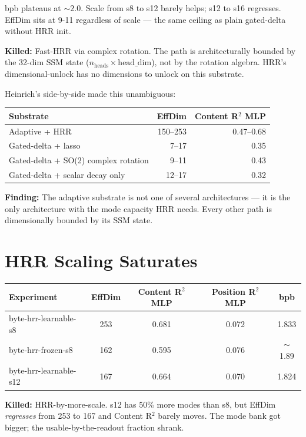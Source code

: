 \documentclass[11pt,a4paper]{report}
\newcommand{\finding}[1]{\textcolor{finding}{\textbf{Finding:}} #1}
\newcommand{\killed}[1]{\textcolor{killed}{\textbf{Killed:}} #1}
\begin{document}
bpb plateaus at $\sim 2.0$. Scale from s8 to s12 barely helps; s12 to s16 regresses. EffDim sits at 9-11 regardless of scale --- the same ceiling as plain gated-delta without HRR init.

\killed{Fast-HRR via complex rotation. The path is architecturally bounded by the 32-dim SSM state ($n_\text{heads} \times \text{head\_dim}$), not by the rotation algebra. HRR's dimensional-unlock has no dimensions to unlock on this substrate.}

Heinrich's side-by-side made this unambiguous:

\begin{center}
\begin{tabular}{lrr}
\toprule
Substrate & EffDim & Content R$^2$ MLP \\
\midrule
Adaptive + HRR & 150--253 & 0.47--0.68 \\
Gated-delta + lasso & 7--17 & 0.35 \\
Gated-delta + SO(2) complex rotation & 9--11 & 0.43 \\
Gated-delta + scalar decay only & 12--17 & 0.32 \\
\bottomrule
\end{tabular}
\end{center}

\finding{The adaptive substrate is not one of several architectures --- it is the only architecture with the mode capacity HRR needs. Every other path is dimensionally bounded by its SSM state.}


\chapter{HRR Scaling Saturates}

\begin{center}
\begin{tabular}{lcccc}
\toprule
Experiment & EffDim & Content R$^2$ MLP & Position R$^2$ MLP & bpb \\
\midrule
byte-hrr-learnable-s8 & 253 & 0.681 & 0.072 & 1.833 \\
byte-hrr-frozen-s8 & 162 & 0.595 & 0.076 & $\sim$1.89 \\
byte-hrr-learnable-s12 & 167 & 0.664 & 0.070 & 1.824 \\
\bottomrule
\end{tabular}
\end{center}

\killed{HRR-by-more-scale. s12 has 50\% more modes than s8, but EffDim \emph{regresses} from 253 to 167 and Content R$^2$ barely moves. The mode bank got bigger; the usable-by-the-readout fraction shrank.}
\end{document}
